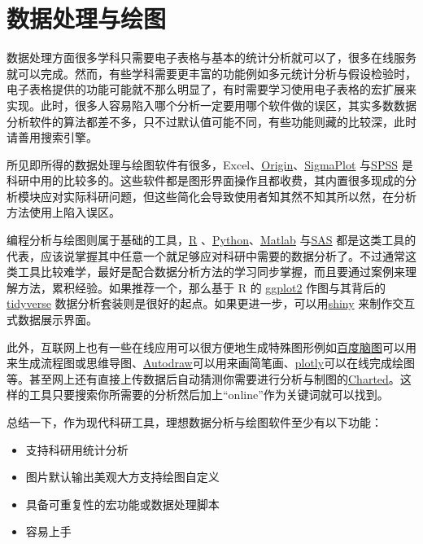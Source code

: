 \documentclass[]{tufte-book}
\providecommand{\tightlist}{%
  \setlength{\itemsep}{0pt}\setlength{\parskip}{0pt}}
\begin{document}
\hypertarget{ux6570ux636eux5904ux7406ux4e0eux7ed8ux56fe}{%
\section*{数据处理与绘图}\label{ux6570ux636eux5904ux7406ux4e0eux7ed8ux56fe}}

数据处理方面很多学科只需要电子表格与基本的统计分析就可以了，很多在线服务就可以完成。然而，有些学科需要更丰富的功能例如多元统计分析与假设检验时，电子表格提供的功能可能就不那么明显了，有时需要学习使用电子表格的宏扩展来实现。此时，很多人容易陷入哪个分析一定要用哪个软件做的误区，其实多数数据分析软件的算法都差不多，只不过默认值可能不同，有些功能则藏的比较深，此时请善用搜索引擎。

所见即所得的数据处理与绘图软件有很多，Excel、\href{https://www.originlab.com/}{Origin}、\href{https://systatsoftware.com/}{SigmaPlot} 与\href{https://www.ibm.com/analytics/spss-statistics-software}{SPSS} 是科研中用的比较多的。这些软件都是图形界面操作且都收费，其内置很多现成的分析模块应对实际科研问题，但这些简化会导致使用者知其然不知其所以然，在分析方法使用上陷入误区。

编程分析与绘图则属于基础的工具，\href{https://www.r-project.org/}{R} 、\href{https://www.python.org/}{Python}、\href{https://www.mathworks.com/products/matlab.html}{Matlab} 与\href{https://www.sas.com/en_us/home.html}{SAS} 都是这类工具的代表，应该说掌握其中任意一个就足够应对科研中需要的数据分析了。不过通常这类工具比较难学，最好是配合数据分析方法的学习同步掌握，而且要通过案例来理解方法，累积经验。如果推荐一个，那么基于 R 的 \href{https://ggplot2.tidyverse.org/}{ggplot2} 作图与其背后的 \href{https://www.tidyverse.org/}{tidyverse} 数据分析套装则是很好的起点。如果更进一步，可以用\href{https://www.rstudio.com/products/shiny/}{shiny} 来制作交互式数据展示界面。

此外，互联网上也有一些在线应用可以很方便地生成特殊图形例如\href{http://naotu.baidu.com/}{百度脑图}可以用来生成流程图或思维导图、\href{https://www.autodraw.com/}{Autodraw}可以用来画简笔画、\href{https://plot.ly/}{plotly}可以在线完成绘图等。甚至网上还有直接上传数据后自动猜测你需要进行分析与制图的\href{https://www.charted.co/}{Charted}。这样的工具只要搜索你所需要的分析然后加上``online''作为关键词就可以找到。

总结一下，作为现代科研工具，理想数据分析与绘图软件至少有以下功能：

\begin{itemize}
\tightlist
\item
  支持科研用统计分析
\item
  图片默认输出美观大方支持绘图自定义
\item
  具备可重复性的宏功能或数据处理脚本
\item
  容易上手
\end{itemize}
\end{document}
